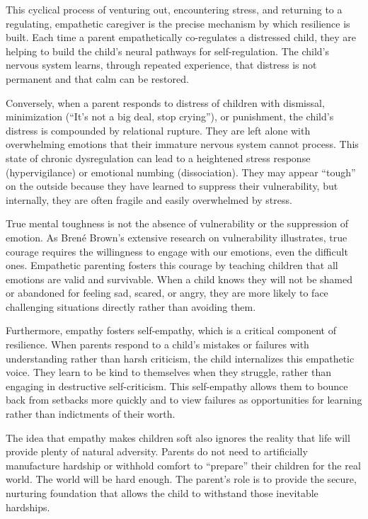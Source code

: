 This cyclical process of venturing out, encountering stress, and returning to a regulating, empathetic caregiver is the precise mechanism by which resilience is built.
Each time a parent empathetically co-regulates a distressed child, they are helping to build the child's neural pathways for self-regulation.
The child's nervous system learns, through repeated experience, that distress is not permanent and that calm can be restored.

Conversely, when a parent responds to distress of children with dismissal, minimization (``It's not a big deal, stop crying''), or punishment, the child's distress is compounded by relational rupture.
They are left alone with overwhelming emotions that their immature nervous system cannot process.
This state of chronic dysregulation can lead to a heightened stress response (hypervigilance) or emotional numbing (dissociation).
They may appear ``tough'' on the outside because they have learned to suppress their vulnerability, but internally, they are often fragile and easily overwhelmed by stress.

True mental toughness is not the absence of vulnerability or the suppression of emotion.
As Brené Brown's extensive research on vulnerability illustrates, true courage requires the willingness to engage with our emotions, even the difficult ones.
Empathetic parenting fosters this courage by teaching children that all emotions are valid and survivable.
When a child knows they will not be shamed or abandoned for feeling sad, scared, or angry, they are more likely to face challenging situations directly rather than avoiding them.

Furthermore, empathy fosters self-empathy, which is a critical component of resilience.
When parents respond to a child's mistakes or failures with understanding rather than harsh criticism, the child internalizes this empathetic voice.
They learn to be kind to themselves when they struggle, rather than engaging in destructive self-criticism.
This self-empathy allows them to bounce back from setbacks more quickly and to view failures as opportunities for learning rather than indictments of their worth.

The idea that empathy makes children soft also ignores the reality that life will provide plenty of natural adversity.
Parents do not need to artificially manufacture hardship or withhold comfort to ``prepare'' their children for the real world.
The world will be hard enough.
The parent's role is to provide the secure, nurturing foundation that allows the child to withstand those inevitable hardships.

